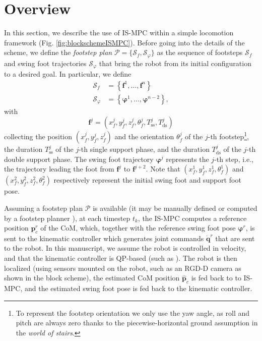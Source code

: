 \section{Overview}
In this section, we describe the use of IS-MPC within a simple locomotion
framework (Fig. \ref{fig:blockschemeISMPC}). Before going into the details of the
scheme, we define the \textit{footstep plan}
$\mathcal{P} = \{\mathcal{S}_f, \mathcal{S}_{\varphi}\}$ as the sequence of footsteps
$\mathcal{S}_f$ and swing foot trajectories $\mathcal{S}_{\varphi}$ that bring the
robot from its initial configuration to a desired goal. In particular, we define
\begin{align*}
    \mathcal{S}_f &= \left\{ \bm{f}^1, \dots, \bm{f}^n \right\} \\
    \mathcal{S}_{\varphi} &= \left\{ \bm{\varphi}^1, \dots, \bm{\varphi}^{n-2} \right\},
\end{align*}
with
\begin{equation*}
    \bm{f}^j = \left( x_f^j, y_f^j, z_f^j, \theta_f^j, T_{\mathrm{ss}}^j, T_{\mathrm{ds}}^j \right)
\end{equation*}
collecting the position $(x_f^j, y_f^j, z_f^j)$ and the orientation $\theta_f^j$
of the $j$-th footstep\footnote{To represent the footstep orientation we only
use the yaw angle, as roll and pitch are always zero thanks to the
piecewise-horizontal ground assumption in the \textit{world of stairs}.},
the duration $T_{\mathrm{ss}}^j$ of
the $j$-th single support phase, and the duration $T_{\mathrm{ds}}^j$ of the
$j$-th double support phase. The swing foot trajectory $\bm{\varphi}^j$ represents the 
$j$-th step, i.e., the trajectory leading the foot from $\bm{f}^j$ to $\bm{f}^{j+2}$.
Note that $(x_f^1, y_f^1, z_f^1, \theta_f^1)$
and $(x_f^2, y_f^2, z_f^2, \theta_f^2)$
respectively represent the initial swing foot and support foot pose.

Assuming a footstep plan $\mathcal{P}$ is available (it may be manually defined
or computed by a footstep planner \cite{Cipriano2023RAS}), at each timestep $t_k$,
the IS-MPC computes a reference position $\bm{p}_c^r$ of the CoM, which, together
with the reference swing foot pose $\bm{\varphi}^r$, is sent to the kinematic
controller which generates joint commands $\dot{\bm{q}}^r$ that are sent to the robot.
In this manuscript, we assume the robot is controlled in velocity, and that the
kinematic controller is QP-based (such as \cite{Escande2014IJRR}).
The robot is then localized (using sensors mounted on the robot, such as an
RGD-D camera as shown in the block scheme), the estimated CoM position
$\hat{\bm{p}}_c$ is fed back to to IS-MPC, and the estimated swing foot
pose is fed back to the kinematic controller.

